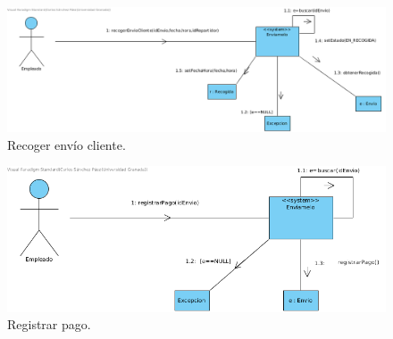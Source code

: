 \documentclass[12pt,spanish]{article}
\begin{document}
\begin{figure}[H]
\centering
\includegraphics[scale=0.5]{recogerEnvioCliente.png}
\caption{Recoger envío cliente.}
\end{figure}

\begin{figure}[H]
\centering
\includegraphics[scale=0.5]{registrarPago.png}
\caption{Registrar pago.}
\end{figure}



\end{document}
